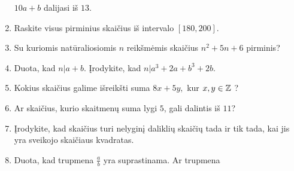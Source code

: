 \begin{enumerate}
    $10a+b$ dalijasi iš $13$. 
 \item Raskite visus pirminius skaičius iš intervalo $[180, 200]$.  
  \item Su kuriomis natūraliosiomis $n$ reikšmėmis skaičius $n^2 + 5n + 6$
    pirminis?  
  \item Duota, kad $n|a+b$. Įrodykite, kad $n|a^3+2a+b^3+2b$.  
  \item Kokius skaičius galime išreikšti suma $8x + 5y,$ kur $x,y \in \mathbb Z$ ?
  \item Ar skaičius, kurio skaitmenų suma lygi $5$, gali dalintis iš $11$?  
  \item Įrodykite, kad skaičius turi nelyginį daliklių skaičių tada ir tik
    tada, kai jis yra sveikojo skaičiaus kvadratas.
  \item Duota, kad trupmena $\frac{a}{b}$ yra suprastinama. Ar trupmena

\end{enumerate}
